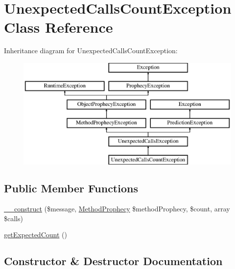 \hypertarget{class_prophecy_1_1_exception_1_1_prediction_1_1_unexpected_calls_count_exception}{}\section{Unexpected\+Calls\+Count\+Exception Class Reference}
\label{class_prophecy_1_1_exception_1_1_prediction_1_1_unexpected_calls_count_exception}
Inheritance diagram for Unexpected\+Calls\+Count\+Exception\+:\begin{figure}[H]
\begin{center}
\leavevmode
\includegraphics[height=5.544555cm]{class_prophecy_1_1_exception_1_1_prediction_1_1_unexpected_calls_count_exception}
\end{center}
\end{figure}
\subsection*{Public Member Functions}
\begin{DoxyCompactItemize}
\item 
\mbox{\hyperlink{class_prophecy_1_1_exception_1_1_prediction_1_1_unexpected_calls_count_exception_ace26963cc3f82c31832b0447fd6aae4b}{\+\_\+\+\_\+construct}} (\$message, \mbox{\hyperlink{class_prophecy_1_1_prophecy_1_1_method_prophecy}{Method\+Prophecy}} \$method\+Prophecy, \$count, array \$calls)
\item 
\mbox{\hyperlink{class_prophecy_1_1_exception_1_1_prediction_1_1_unexpected_calls_count_exception_a480984c2b94e84a20ecb8628a3396fbb}{get\+Expected\+Count}} ()
\end{DoxyCompactItemize}


\subsection{Constructor \& Destructor Documentation}
\mbox{\label{class_prophecy_1_1_exception_1_1_prediction_1_1_unexpected_calls_count_exception_ace26963cc3f82c31832b0447fd6aae4b}} 
